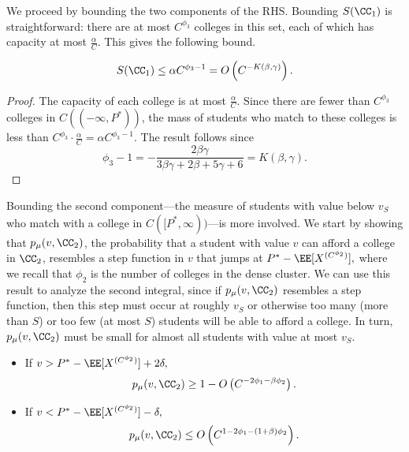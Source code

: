 \documentclass[10pt]{article}
\begin{document}
\begin{ReviewVerbatim}
We proceed by bounding the two components of the RHS. Bounding $S(\CC_1)$ is straightforward: there are at most $C^{\phi_3}$ colleges in this set, each of which has capacity at most $\frac{\alpha}{C}.$ This gives the following bound.
\begin{proposition}\label{prop:duck-1}
\begin{equation}
    S(\CC_1) \le \alpha C^{\phi_3 - 1} = O\left(C^{-K(\beta,\gamma)}\right).
\end{equation}
\end{proposition}
\begin{proof}
    The capacity of each college is at most $\frac{\alpha}{C}$. Since there are fewer than $C^{\phi_3}$ colleges in $C((-\infty, P^*))$, the mass of students who match to these colleges is less than $C^{\phi_3}\cdot \frac{\alpha}{C} = \alpha C^{\phi_3 - 1}.$ The result follows since
    \begin{equation}
        \phi_3 - 1 = -\frac{2\beta\gamma}{3\beta\gamma + 2\beta + 5\gamma + 6} = K(\beta,\gamma).
    \end{equation}
\end{proof}
Bounding the second component---the measure of students with value below $v_S$ who match with a college in $C([P^*,\infty))$---is more involved. We start by showing that $p_\mu(v, \CC_2)$, the probability that a student with value $v$ can afford a college in $\CC_2$, resembles a step function in $v$ that jumps at $P^* - \EE[X^{(C^{\phi_2})}],$ where we recall that $\phi_2$ is the number of colleges in the dense cluster. We can use this result to analyze the second integral, since if $p_\mu(v, \CC_2)$ resembles a step function, then this step must occur at roughly $v_S$ or otherwise too many (more than $S$) or too few (at most $S$) students will be able to afford a college. In turn, $p_\mu(v, \CC_2)$ must be small for almost all students with value at most $v_S$.

\begin{proposition}\label{prop:tomato}
\quad
    \begin{itemize}
        \item[(i)] If $v > P^* - \EE[X^{(C^{\phi_2})}]  + 2\delta,$
        \begin{equation}
            p_\mu(v, \CC_2) \ge 1 - O\left(C^{-2\phi_1 - \beta\phi_2}\right).
        \end{equation}
        \item[(ii)] If $v < P^* - \EE[X^{(C^{\phi_2})}]  - \delta,$
        \begin{equation}
            p_\mu(v, \CC_2) \le O\left(C^{1-2\phi_1 - (1 + \beta)\phi_2}\right).
        \end{equation}
    \end{itemize}
\end{proposition}


\end{ReviewVerbatim}
\end{document}
